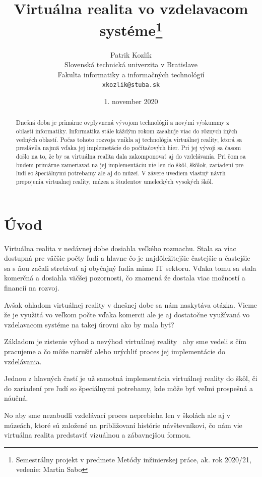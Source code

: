 \documentclass[10pt,oneside,slovak,a4paper]{article}
\title{Virtuálna realita vo vzdelavacom systéme\thanks{Semestrálny projekt v predmete Metódy inžinierskej práce, ak. rok 2020/21, vedenie: Martin Sabo}} %
\author{Patrik Kozlík\\[2pt]
	{\small Slovenská technická univerzita v Bratislave}\\
	{\small Fakulta informatiky a informačných technológií}\\
	{\small \texttt{xkozlik@stuba.sk}}
	}
\date{\small 1. november 2020} %
\begin{document}
\maketitle

\begin{abstract}
Dnešná doba je primárne ovplyvnená vývojom technológii a novými výskummy z oblasti informatiky. Informatika stále káždým rokom zasahuje
viac do rôznych iných vedných oblastí. Počas tohoto rozvoja vnikla aj technológia virtuálnej reality, ktorá sa preslávila najmä vďaka jej
implemetácie do počítačových hier. Pri jej vývoji sa časom došlo na to, že by sa virtuálna realita dala zakomponovať aj do vzdelávania. 
Pri čom sa budem primárne zameriavať na jej implementáciu nie len do škôl, škôlok, zariadení pre ľudí so špeciálnymi potrebamy ale aj do múzeí. V závere uvediem vlastný návrh prepojenia virtualnej reality, múzea a študentov umeleckých vysokých škôl.   	
\end{abstract}



\section{Úvod}

Virtuálna realita v nedávnej dobe dosiahla veľkého rozmachu. Stala sa viac dostupná pre väčšie počty ľudí a hlavne čo je najdôležitejšie 
častejšie a častejšie sa s ňou začali stretávať aj obyčajný ľudia mimo IT sektoru. Vďaka tomu sa stala komerčná a dosiahla väčšej pozornosti,
čo znamená že dostala viac možností a financií na rozvoj. 

Avšak ohľadom virtuálnej reality v dnešnej dobe sa nám naskytáva otázka. Vieme že je využitá vo veľkom počte vďaka komercii ale je aj dostatočne využívaná vo vzdelavacom systéme na takej úrovni ako by mala byť?

Základom je zistenie výhod a nevýhod virtuálnej reality~\cite{Procon} aby sme vedeli s čím pracujeme a čo môže narušiť alebo urýchliť proces 
jej implementácie do vzdelávania.

Jednou z hlavných častí je už samotná implementácia virtuálnej reality do škôl, či do zariadení pre ľudí so špeciálnymi potrebamy,
kde môže byť veľmi prospešná a náučná.~\cite{VR}

No aby sme nezabudli vzdelávací proces neprebieha len v školách ale aj v múzeách, ktoré sú založené na približovaní histórie návštevníkovi, čo nám vie virtuálna realita predstaviť vizuálnou a zábavnejšou formou.
\end{document}
